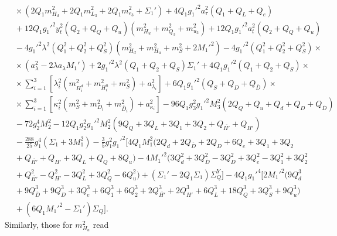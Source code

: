 \documentclass[preprint,amsmath,amssymb,aps,superscriptaddress,prd,showpacs,floatfix,nofootinbib]{revtex4-1}
\begin{document}
\begin{subequations}
\begin{align}
&{}\times\left ( 2Q_1m_{H_d}^2+2Q_1m_{L_3}^2+2Q_1m_{e_3}^2+\Sigma_1'\right )+4Q_1g_1'^2a_\tau^2\left ( Q_1+Q_L+Q_e\right )\nonumber\\
&{}+12Q_1g_1'^2y_t^2\left ( Q_2+Q_Q+Q_u\right )\left ( m_{H_u}^2+m_{Q_3}^2+m_{u_3}^2\right )+12Q_1g_1'^2a_t^2\left ( Q_2+Q_Q+Q_u\right )\nonumber\\
&{}-4g_1'^2\lambda^2\left ( Q_1^2+Q_2^2+Q_S^2\right )\left ( m_{H_d}^2+m_{H_u}^2+m_S^2+2M_1'^2\right )-4g_1'^2\left ( Q_1^2+Q_2^2+Q_S^2\right )\times\nonumber\\
&{}\times\left ( a_\lambda^2-2\lambda a_\lambda M_1'\right )+2g_1'^2\lambda^2\left ( Q_1+Q_2+Q_S\right )\Sigma_1'+4Q_1g_1'^2\left ( Q_1+Q_2+Q_S\right )\times\nonumber\\
&{}\times\sum_{i=1}^3\left [ \lambda_i^2\left ( m_{H_i^d}^2+m_{H_i^u}^2+m_S^2\right )+a_{\lambda_i}^2\right ]+6Q_1g_1'^2\left ( Q_S+Q_D+Q_{\overline{D}}\right )\times\nonumber\\
&{}\times\sum_{i=1}^3\left [ \kappa_i^2\left ( m_S^2+m_{D_i}^2+m_{\overline{D}_i}^2\right )+a_{\kappa_i}^2\right ]-96Q_1g_3^2g_1'^2M_3^2\left ( 2Q_Q+Q_u+Q_d+Q_D+Q_{\overline{D}}\right )\nonumber\\
&{}-72g_2^4M_2^2-12Q_1g_2^2g_1'^2M_2^2\left ( 9Q_Q+3Q_L+3Q_1+3Q_2+Q_{\overline{H'}}+Q_{H'}\right )\nonumber\\
&{}-\frac{288}{25}g_1^4\left ( \Sigma_1+3M_1^2\right )-\frac{3}{5}g_1^2g_1'^2\Big [ 4Q_1M_1^2\big ( 2Q_d+2Q_{\overline{D}}+2Q_D+6Q_e+3Q_1+3Q_2\nonumber\\
&{}+Q_{\overline{H'}}+Q_{H'}+3Q_L+Q_Q+8Q_u\big )-4M_1'^2\big ( 3Q_d^2+3Q_{\overline{D}}^2-3Q_D^2+3Q_e^2-3Q_1^2+3Q_2^2\nonumber\\
&{}+Q_{\overline{H'}}^2-Q_{H'}^2-3Q_L^2+3Q_Q^2-6Q_u^2\big )+\left ( \Sigma_1'-2Q_1\Sigma_1\right )\Sigma_Q^Y\Big ]-4Q_1g_1'^4\Big [ 2M_1'^2\big ( 9Q_d^3\nonumber\\
&{}+9Q_{\overline{D}}^3+9Q_D^3+3Q_e^3+6Q_1^3+6Q_2^3+2Q_{\overline{H'}}^3+2Q_{H'}^3+6Q_L^3+18Q_Q^3+3Q_S^3+9Q_u^3\big )\nonumber\\
&{}+\left ( 6Q_1M_1'^2-\Sigma_1'\right )\Sigma_Q\Big ].\label{eq:USSMmHd2Ot2Coeff}
\end{align}
\end{subequations}
Similarly, those for $m_{H_u}^2$ read
\end{document}
